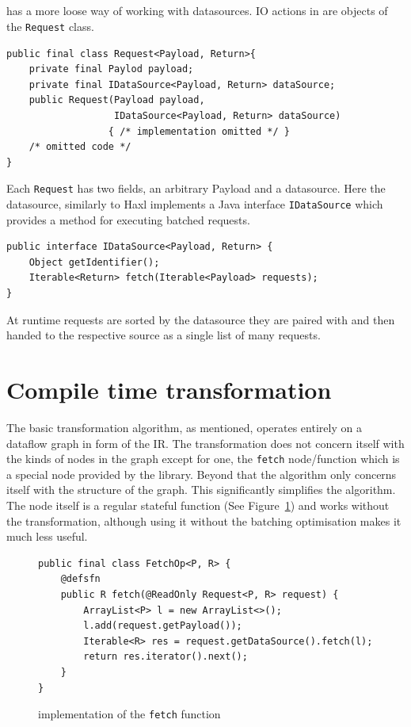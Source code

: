 \subsection{\yauhau{}}

\yauhau{} has a more loose way of working with datasources.
IO actions in \yauhau{} are objects of the \texttt{Request} class.

\begin{verbatim}
public final class Request<Payload, Return>{
    private final Paylod payload;
    private final IDataSource<Payload, Return> dataSource;
    public Request(Payload payload,
                   IDataSource<Payload, Return> dataSource)
                  { /* implementation omitted */ }
    /* omitted code */
}
\end{verbatim}

Each \texttt{Request} has two fields, an arbitrary Payload and a datasource.
Here the datasource, similarly to Haxl implements a Java interface \texttt{IDataSource} which provides a method for executing batched requests.

\begin{verbatim}
public interface IDataSource<Payload, Return> {
    Object getIdentifier();
    Iterable<Return> fetch(Iterable<Payload> requests);
}
\end{verbatim}

At runtime requests are sorted by the datasource they are paired with and then handed to the respective source as a single list of many requests.

\section{Compile time transformation}

The basic \yauhau{} transformation algorithm, as mentioned, operates entirely on a dataflow graph in form of the IR.
The transformation does not concern itself with the kinds of nodes in the graph except for one, the \texttt{fetch} node/function which is a special node provided by the \yauhau{} library.
Beyond that the algorithm only concerns itself with the structure of the graph.
This significantly simplifies the algorithm.
The \fetch{} node itself is a regular stateful function (See Figure~\ref{fig:fetch-implementation}) and works without the \yauhau{} transformation, although using it without the batching optimisation makes it much less useful.

\begin{figure}
\begin{verbatim}
public final class FetchOp<P, R> {
    @defsfn
    public R fetch(@ReadOnly Request<P, R> request) {
        ArrayList<P> l = new ArrayList<>();
        l.add(request.getPayload());
        Iterable<R> res = request.getDataSource().fetch(l);
        return res.iterator().next();
    }
}
\end{verbatim}
\caption{implementation of the \texttt{fetch} function}
\label{fig:fetch-implementation}
\end{figure}

